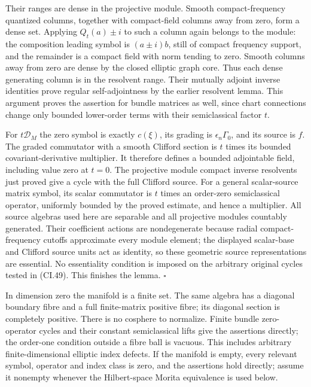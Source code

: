 \documentclass[
  11pt,
]{article}
\begin{document}
Their ranges are dense in the projective module. Smooth
compact-frequency quantized columns, together with compact-field columns
away from zero, form a dense set. Applying \(Q_t(a)\pm i\) to such a
column again belongs to the module: the composition leading symbol is
\((a\pm i)b\), still of compact frequency support, and the remainder is
a compact field with norm tending to zero. Smooth columns away from zero
are dense by the closed elliptic graph core. Thus each dense generating
column is in the resolvent range. Their mutually adjoint inverse
identities prove regular self-adjointness by the earlier resolvent
lemma. This argument proves the assertion for bundle matrices as well,
since chart connections change only bounded lower-order terms with their
semiclassical factor \(t\).

For \(t\mathscr D_M\) the zero symbol is exactly \(c(\xi)\), its grading
is \(\epsilon_n\Gamma_0\), and its source is \(f\). The graded
commutator with a smooth Clifford section is \(t\) times its bounded
covariant-derivative multiplier. It therefore defines a bounded
adjointable field, including value zero at \(t=0\). The projective
module compact inverse resolvents just proved give a cycle with the full
Clifford source. For a general scalar-source matrix symbol, its scalar
commutator is \(t\) times an order-zero semiclassical operator,
uniformly bounded by the proved estimate, and hence a multiplier. All
source algebras used here are separable and all projective modules
countably generated. Their coefficient actions are nondegenerate because
radial compact-frequency cutoffs approximate every module element; the
displayed scalar-base and Clifford source units act as identity, so
these geometric source representations are essential. No essentiality
condition is imposed on the arbitrary original cycles tested in (CI.49).
This finishes the lemma. \(\square\)

In dimension zero the manifold is a finite set. The same algebra has a
diagonal boundary fibre and a full finite-matrix positive fibre; its
diagonal section is completely positive. There is no cosphere to
normalize. Finite bundle zero-operator cycles and their constant
semiclassical lifts give the assertions directly; the order-one
condition outside a fibre ball is vacuous. This includes arbitrary
finite-dimensional elliptic index defects. If the manifold is empty,
every relevant symbol, operator and index class is zero, and the
assertions hold directly; assume it nonempty whenever the Hilbert-space
Morita equivalence is used below.
\end{document}
